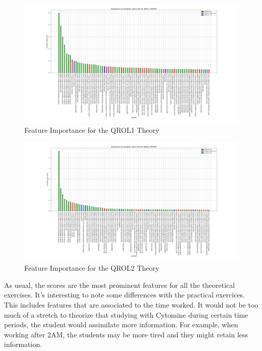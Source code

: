 \documentclass[a4paper,11pt]{report}
\numberwithin{figure}{section} %
\begin{document}
      \begin{figure}[H]
      \centering
      \includegraphics[width=.95\linewidth]{plots/var_importance_QROL1_THEORY_2018-05-02_20_54_23.png}
      \caption{Feature Importance for the QROL1 Theory}
      \label{fig:var_th2}
      \end{figure}

      \begin{figure}[H]
      \centering
      \includegraphics[width=.95\linewidth]{plots/var_importance_QROL2_THEORY_2018-05-02_20_53_44.png}
      \caption{Feature Importance for the QROL2 Theory}
      \label{fig:var_th3}
      \end{figure}

    As usual, the scores are the most prominent features for all the theoretical exercises.
    It's interesting to note some differences with the practical exercices.
    This includes features that are associated to the time worked.
    It would not be too much of a stretch to theorize that studying with Cytomine during certain time periods, the student would assimilate more information.
    For example, when working after 2AM, the students may be more tired and they might retain less information.\\
\end{document}
